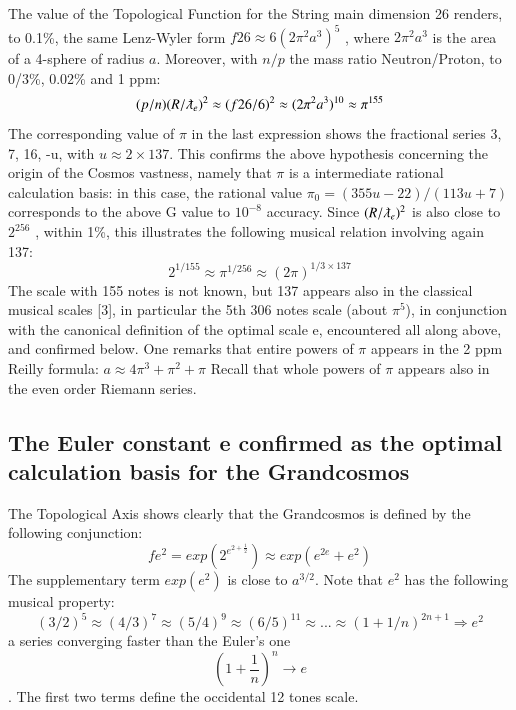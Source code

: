 \documentclass[twoside,draft]{article}
\begin{document}
\begin{sloppypar}
{The value of the Topological Function for the String
main dimension 26 renders, to 0.1\%, the same Lenz-Wyler form $f{26} \approx 6(2\pi^{2} a^{3} )^{5}$ , where $2\pi^{2}a^{3}$ is the area of a 4-sphere of radius $a$. Moreover, with $n/p$ the mass ratio Neutron/Proton, to 0/3\%, 0.02\% and 1
ppm:
$$(p/n) (R/\lambdabar_{e})^{2} \approx (f{26}/6)^{2} \approx (2\pi^{2} a^{3})^{10} \approx \pi^{155}$$
The corresponding value of $\pi$ in the last expression shows the fractional series 3, 7, 16, -u, with $u \approx
2 \times 137$. This confirms the above hypothesis concerning the origin of the Cosmos vastness, namely
that $\pi$ is a intermediate rational calculation basis: in this case, the rational value $\pi_{0} = (355u-22)/
(113u+7)$ corresponds to the above G value to $10^{-8}$ accuracy.
Since $(R/\lambdabar_{e})^{2}$ is also close to $2^{256}$ , within 1\%, this illustrates the following musical relation
involving again 137:
$$2^{1/155} \approx \pi^{1/256} \approx (2\pi)^{1/3 \times 137}$$
The scale with 155 notes is not known, but 137 appears also in the classical musical scales [3], in
particular the 5th 306 notes scale (about $\pi^{5}$), in conjunction with the canonical definition of the optimal
scale e, encountered all along above, and confirmed below.
One remarks that entire powers of $\pi$ appears in the 2 ppm Reilly formula: $a \approx 4\pi^{3} + \pi^{2} + \pi$
Recall that whole powers of $\pi$ appears also in the even order Riemann series.

\subsection {The Euler constant e confirmed as the optimal calculation basis for the Grandcosmos}

The Topological Axis shows clearly that the Grandcosmos is defined by the following
conjunction:
\begin{equation}
f{e^{2}} = exp(2^{e^{2+\frac{1}{2}}}) \approx exp(e^{2e}+e^{2})
\end{equation}
The supplementary term $exp(e^{2})$ is close to $a^{3/2}$. Note that $e^{2}$ has the following musical property:
\begin{equation}
(3/2)^{5} \approx (4/3)^{7} \approx (5/4)^{9} \approx (6/5)^{11} \approx ... \approx (1+1/n)^{2n+1} \Rightarrow e^{2}
\end{equation}
a series converging faster than the Euler's one $$(1+\frac{1}{n})^{n} \rightarrow e$$. The first two terms define
the occidental 12 tones scale.

}
\end{sloppypar}
\end{document}
